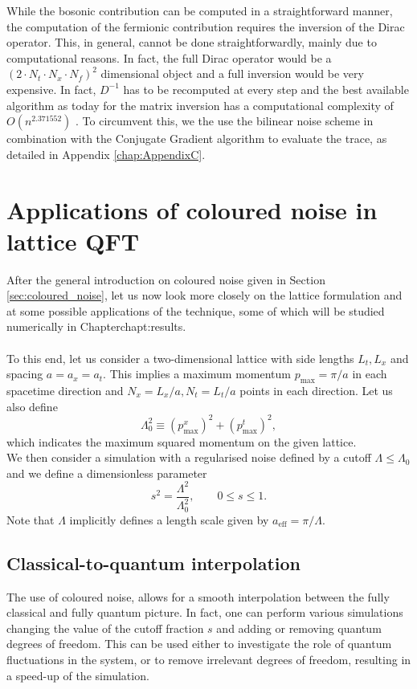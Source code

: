 While the bosonic contribution can be computed in a straightforward manner, the computation of the fermionic contribution requires the inversion of the Dirac operator. This, in general, cannot be done straightforwardly, mainly due to computational reasons.
In fact, the full Dirac operator would be a $(2 \cdot N_t \cdot N_x \cdot N_f)^2$ dimensional object and a full inversion would be very expensive. In fact, $D^{-1}$ has to be recomputed at every step and the best available algorithm as today for the matrix inversion has a computational complexity of $O(n^{2.371552})$ \cite{williams2023new}. To circumvent this, we the use the bilinear noise scheme \cite{bilinearnoise1,bilinearnoise2} in combination with the Conjugate Gradient algorithm to evaluate the trace, as detailed in Appendix \ref{chap:AppendixC}.

\newpage


\section{Applications of coloured noise in lattice QFT}
\label{sec:lattice_with_coloured_noise}
After the general introduction on coloured noise given in Section \ref{sec:coloured_noise}, let us now look more closely on the lattice formulation and at some possible applications of the technique, some of which will be studied numerically in Chapter{chapt:results}. \\~\\
To this end, let us consider a two-dimensional lattice with side lengths $L_t, L_x$ and spacing $a = a_x = a_t$. This implies a maximum momentum $p_\text{max} = \pi / a$ in each spacetime direction and $N_x=L_x/a, N_t=L_t/a$ points in each direction. Let us also define 
\begin{equation}
	\Lambda_0^2 \equiv (p^x_\text{max})^2 + (p^t_\text{max})^2,
\end{equation}
which indicates the maximum squared momentum on the given lattice. \\
We then consider a simulation with a regularised noise defined by a cutoff $\Lambda \leq \Lambda_0$ and we define a dimensionless parameter
\begin{equation}
	s^2 = \frac{\Lambda^2}{\Lambda_0^2}, \qquad 0 \leq s \leq 1.
\end{equation}
Note that $\Lambda$ implicitly defines a length scale given by  $a_\text{eff} = \pi/\Lambda$.\\

\subsection{Classical-to-quantum interpolation}
The use of coloured noise, allows for a smooth interpolation between the fully classical and fully quantum picture. In fact, one can perform various simulations changing the value of the cutoff fraction $s$ and adding or removing quantum degrees of freedom. This can be used either to investigate the role 
of quantum fluctuations in the system, or to remove irrelevant degrees of freedom, resulting in a speed-up of the simulation.

